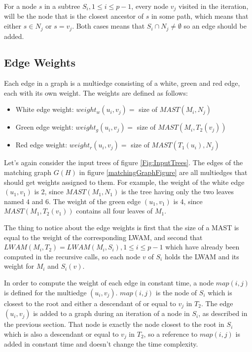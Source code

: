 For a node $s$ in a subtree $S_i, 1 \le i \le p-1$, every node $v_j$ visited in the iteration, will be the node that is the closest ancestor of $s$ in some path, which means that either $s \in N_j$ or $s=v_j$. Both cases means that $S_i \cap N_j \ne \emptyset$ so an edge should be added.

\subsection{Edge Weights}
Each edge in a graph is a multiedge consisting of a white, green and red edge, each with its own weight. The weights are defined as follows:
\begin{itemize}
	\item White edge weight: $weight_w(u_i, v_j)=$ size of $MAST(M_i,N_j)$
	\item Green edge weight: $weight_g(u_i, v_j)=$ size of $MAST(M_i,T_2(v_j))$
	\item Red edge weight: $weight_r(u_i, v_j)=$ size of $MAST(T_1(u_i),N_j)$
\end{itemize}

Let's again consider the input trees of figure \ref{Fig:InputTrees}. The edges of the matching graph $G(H)$ in figure \ref{matchingGraphFigure} are all multiedges that should get weights assigned to them. For example, the weight of the white edge $(u_1, v_1)$ is 2, since $MAST(M_1,N_1)$ is the tree having only the two leaves named $4$ and $6$. The weight of the green edge $(u_1, v_1)$ is 4, since $MAST(M_1,T_2(v_1))$ contains all four leaves of $M_1$.

The thing to notice about the edge weights is first that the size of a MAST is equal to the weight of the corresponding LWAM, and second that $LWAM(M_i, T_2) = LWAM(M_i, S_i), 1 \le i \le p-1$ which have already been computed in the recursive calls, so each node $v$ of $S_i$ holds the LWAM and its weight for $M_i$ and $S_i(v)$.

In order to compute the weight of each edge in constant time, a node $map(i,j)$ is defined for the multiedge $(u_i,v_j)$. $map(i,j)$ is the node of $S_i$ which is closest to the root and either a descendant of or equal to $v_j$ in $T_2$. The edge $(u_i,v_j)$ is added to a graph during an iteration of a node in $S_i$, as described in the previous section. That node is exactly the node closest to the root in $S_i$ which is also a descendant or equal to $v_j$ in $T_2$, so a reference to $map(i,j)$ is added in constant time and doesn't change the time complexity.

